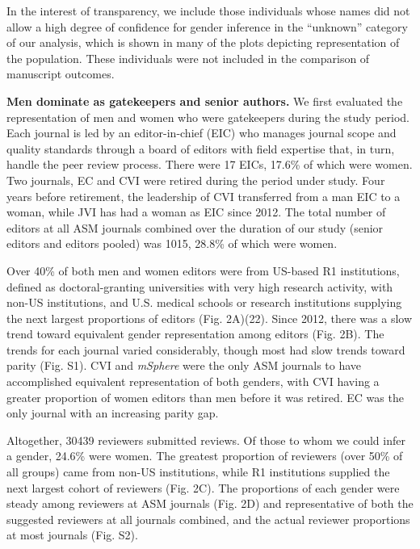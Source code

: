 \documentclass[11pt,]{article}
\begin{document}
In the interest of transparency, we include those individuals whose
names did not allow a high degree of confidence for gender inference in
the ``unknown'' category of our analysis, which is shown in many of the
plots depicting representation of the population. These individuals were
not included in the comparison of manuscript outcomes.

\textbf{Men dominate as gatekeepers and senior authors.} We first
evaluated the representation of men and women who were gatekeepers
during the study period. Each journal is led by an editor-in-chief (EIC)
who manages journal scope and quality standards through a board of
editors with field expertise that, in turn, handle the peer review
process. There were 17 EICs, 17.6\% of which were women. Two journals,
EC and CVI were retired during the period under study. Four years before
retirement, the leadership of CVI transferred from a man EIC to a woman,
while JVI has had a woman as EIC since 2012. The total number of editors
at all ASM journals combined over the duration of our study (senior
editors and editors pooled) was 1015, 28.8\% of which were women.

Over 40\% of both men and women editors were from US-based R1
institutions, defined as doctoral-granting universities with very high
research activity, with non-US institutions, and U.S. medical schools or
research institutions supplying the next largest proportions of editors
(Fig. 2A)(22). Since 2012, there was a slow trend toward equivalent
gender representation among editors (Fig. 2B). The trends for each
journal varied considerably, though most had slow trends toward parity
(Fig. S1). CVI and \emph{mSphere} were the only ASM journals to have
accomplished equivalent representation of both genders, with CVI having
a greater proportion of women editors than men before it was retired. EC
was the only journal with an increasing parity gap.

Altogether, 30439 reviewers submitted reviews. Of those to whom we could
infer a gender, 24.6\% were women. The greatest proportion of reviewers
(over 50\% of all groups) came from non-US institutions, while R1
institutions supplied the next largest cohort of reviewers (Fig. 2C).
The proportions of each gender were steady among reviewers at ASM
journals (Fig. 2D) and representative of both the suggested reviewers at
all journals combined, and the actual reviewer proportions at most
journals (Fig. S2).
\end{document}
